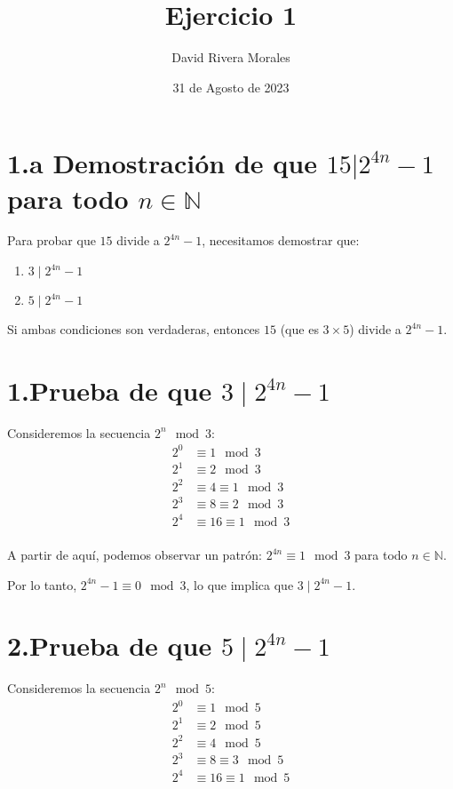 \documentclass{article}
\begin{document}
\title{Ejercicio 1}
\author{David Rivera Morales}
\date{31 de Agosto de 2023}
\maketitle

\section*{1.a Demostración de que $15 | 2^{4n} - 1$ para todo $n \in \mathbb{N}$}

Para probar que $15$ divide a $2^{4n} - 1$, necesitamos demostrar que:
\begin{enumerate}
    \item $3 \mid 2^{4n} - 1$
    \item $5 \mid 2^{4n} - 1$
\end{enumerate}

Si ambas condiciones son verdaderas, entonces $15$ (que es $3 \times 5$) divide a $2^{4n} - 1$.

\section*{1.Prueba de que $3 \mid 2^{4n} - 1$}

Consideremos la secuencia $2^n \mod 3$:
\begin{align*}
2^0 &\equiv 1 \mod 3 \\
2^1 &\equiv 2 \mod 3 \\
2^2 &\equiv 4 \equiv 1 \mod 3 \\
2^3 &\equiv 8 \equiv 2 \mod 3 \\
2^4 &\equiv 16 \equiv 1 \mod 3 \\
\end{align*}

A partir de aquí, podemos observar un patrón: $2^{4n} \equiv 1 \mod 3$ para todo $n \in \mathbb{N}$.

Por lo tanto, $2^{4n} - 1 \equiv 0 \mod 3$, lo que implica que $3 \mid 2^{4n} - 1$.

\section*{2.Prueba de que $5 \mid 2^{4n} - 1$}

Consideremos la secuencia $2^n \mod 5$:
\begin{align*}
2^0 &\equiv 1 \mod 5 \\
2^1 &\equiv 2 \mod 5 \\
2^2 &\equiv 4 \mod 5 \\
2^3 &\equiv 8 \equiv 3 \mod 5 \\
2^4 &\equiv 16 \equiv 1 \mod 5 \\
\end{align*}
\end{document}
